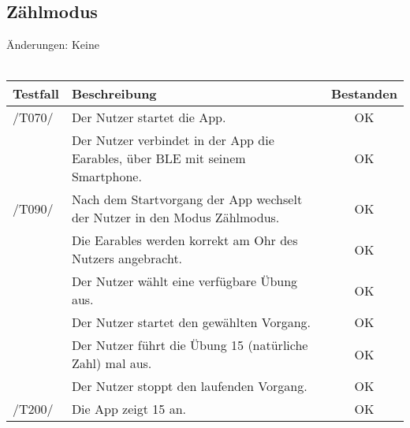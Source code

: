 \documentclass[a4paper,12pt]{article}
\begin{document}
\subsection{Zählmodus}
Änderungen: Keine
\\
\\
\begin{tabular}{ |p{1.5cm} | p{12cm} | c| }
	\hline
	\textbf{Testfall} & \textbf{Beschreibung} & \textbf{Bestanden}\\
	\hline
	/T070/ & Der Nutzer startet die App. & OK\\
	\hline
	& Der Nutzer verbindet in der App die Earables, über BLE mit seinem Smartphone. & OK\\
	\hline
	/T090/ & Nach dem Startvorgang der App wechselt der Nutzer in den Modus \glqq Zählmodus\grqq . & OK\\
	\hline
	& Die Earables werden korrekt am Ohr des Nutzers angebracht. & OK \\
	\hline
	& Der Nutzer wählt eine verfügbare Übung aus. & OK \\
	\hline
	& Der Nutzer startet den gewählten Vorgang. & OK \\
	\hline
	& Der Nutzer führt die Übung 15 (natürliche Zahl) mal aus. & OK \\
	\hline
	& Der Nutzer stoppt den laufenden Vorgang. & OK \\
	\hline
	/T200/ & Die App zeigt 15 an. & OK \\
	\hline
\end{tabular}
\end{document}
